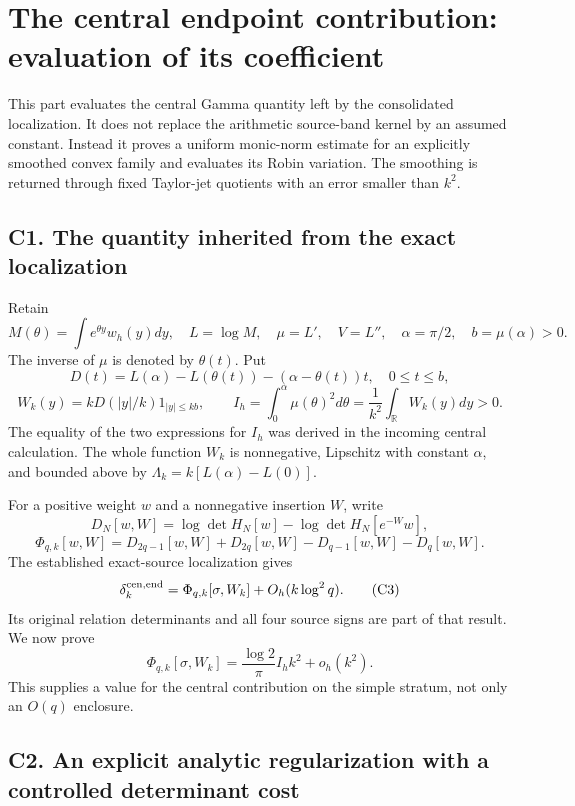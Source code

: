 \newpage

\section{The central endpoint contribution: evaluation of its
coefficient}\label{sa:the-central-endpoint-contribution-evaluation-of-its-coefficient}

This part evaluates the central Gamma quantity left by the consolidated
localization. It does not replace the arithmetic source-band kernel by
an assumed constant. Instead it proves a uniform monic-norm estimate for
an explicitly smoothed convex family and evaluates its Robin variation.
The smoothing is returned through fixed Taylor-jet quotients with an
error smaller than \(k^2\).

\subsection{C1. The quantity inherited from the exact
localization}\label{sa:c1.-the-quantity-inherited-from-the-exact-localization}

Retain \[
M(\theta)=\int e^{\theta y}w_h(y)dy,\quad L=\log M,
\quad \mu=L',\quad V=L'',\quad \alpha=\pi/2,
\quad b=\mu(\alpha)>0.
\] The inverse of \(\mu\) is denoted by \(\theta(t)\). Put \[
D(t)=L(\alpha)-L(\theta(t))-(\alpha-\theta(t))t,
\quad0\le t\le b,
\] \[
W_k(y)=kD(|y|/k)1_{|y|\le kb},\qquad
I_h=\int_0^\alpha\mu(\theta)^2d\theta
=\frac1{k^2}\int_{\mathbb R}W_k(y)dy>0.
\tag{C1}
\] The equality of the two expressions for \(I_h\) was derived in the
incoming central calculation. The whole function \(W_k\) is nonnegative,
Lipschitz with constant \(\alpha\), and bounded above by
\(\Lambda_k=k[L(\alpha)-L(0)]\).

For a positive weight \(w\) and a nonnegative insertion \(W\), write \[
D_N[w,W]=\log\det H_N[w]-\log\det H_N[e^{-W}w],
\] \[
\Phi_{q,k}[w,W]=D_{2q-1}[w,W]+D_{2q}[w,W]
-D_{q-1}[w,W]-D_q[w,W].\tag{C2}
\] The established exact-source localization gives \[
\delta_k^{\rm cen,end}
=\Phi_{q,k}[\sigma,W_k]+O_h(k\log^2q).
\tag{C3}
\] Its original relation determinants and all four source signs are part
of that result. We now prove \[
\boxed{\Phi_{q,k}[\sigma,W_k]
=\frac{\log2}{\pi}I_h k^2+o_h(k^2).}\tag{C4}
\] This supplies a value for the central contribution on the simple
stratum, not only an \(O(q)\) enclosure.

\subsection{C2. An explicit analytic regularization with a controlled
determinant
cost}\label{sa:c2.-an-explicit-analytic-regularization-with-a-controlled-determinant-cost}

